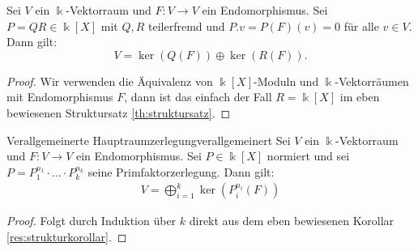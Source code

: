 \documentclass[10pt]{article}
\begin{document}
	\begin{corollary}
		\label{res:strukturkorollar}
		Sei $V$ ein $\Bbbk$-Vektorraum und $F : V \to V$ ein Endomorphismus. Sei $P = QR \in \Bbbk[X]$ mit $Q,R$ teilerfremd und $P.v = P(F)(v) = 0$ für alle $v \in V$. Dann gilt:
		$$V = \ker(Q(F)) \oplus \ker(R(F)).$$
	\end{corollary}
	\begin{proof}
		Wir verwenden die Äquivalenz von $\Bbbk[X]$-Moduln und $\Bbbk$-Vektorräumen mit Endomorphismus $F$, dann ist das einfach der Fall $R = \Bbbk[X]$ im eben bewiesenen Struktursatz \ref{th:struktursatz}.
	\end{proof}
	\begin{importantcorollary}{Verallgemeinerte Hauptraumzerlegung}{verallgemeinert}
		Sei $V$ ein $\Bbbk$-Vektorraum und $F : V \to V$ ein Endomorphismus. Sei $P \in \Bbbk[X]$ normiert und sei $P = P_1^{n_1} \cdot \hdots \cdot P_k^{n_k}$ seine Primfaktorzerlegung. Dann gilt:
		\begin{align*}
			V = \bigoplus_{i = 1}^k \ker(P_i^{n_i}(F))
		\end{align*}
	\end{importantcorollary}
	\begin{proof}
		Folgt durch Induktion über $k$ direkt aus dem eben bewiesenen Korollar \ref{res:strukturkorollar}.
	\end{proof}
	
\end{document}
